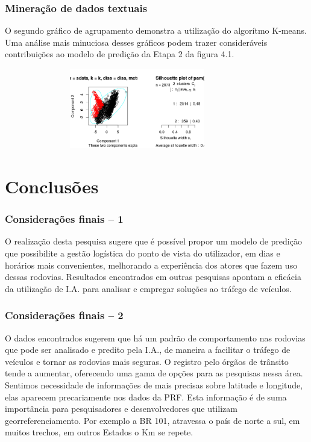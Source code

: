 \documentclass[11pt]{beamer}
\begin{document}
\begin{frame}
	\frametitle{Mineração de dados textuais}
	O segundo gráfico de agrupamento demonstra a utilização do algorítmo K-means. Uma análise mais minuciosa desses gráficos podem trazer consideráveis contribuições ao modelo de predição da Etapa 2 da figura 4.1.
	\begin{figure}[ht]
		\centering
		\includegraphics[width=95mm, height=35mm]{Figuras/Twitter/Cluster2.png}\\
	\end{figure}
\end{frame}
\section{Conclusões}

\begin{frame}
	\frametitle{Considerações finais -- 1}
	O realização desta pesquisa sugere que é possível propor um modelo de predição que possibilite a gestão logística do ponto de vista do utilizador, em dias e horários mais convenientes, melhorando a experiência dos atores que fazem uso dessas rodovias.
	Resultados encontrados em outras pesquisas apontam a eficácia da utilização de I.A. para analisar e empregar soluções ao tráfego de veículos. 

\end{frame}


\begin{frame}
	\frametitle{Considerações finais -- 2}
	O dados encontrados sugerem que há um padrão de comportamento nas rodovias que pode ser analisado e predito pela I.A., de maneira a facilitar o tráfego de veículos e tornar as rodovias mais seguras.
	O registro pelo órgãos de trânsito tende a aumentar, oferecendo uma gama de opções para as pesquisas nessa área.
	Sentimos necessidade de informações de mais precisas sobre latitude e longitude, elas aparecem precariamente nos dados da PRF.
	Esta informação é de suma importância para pesquisadores e desenvolvedores que utilizam georreferenciamento. Por exemplo a BR 101, atravessa o país de norte a sul, em muitos trechos, em outros Estados o Km se repete.
	
\end{frame}
\end{document}
